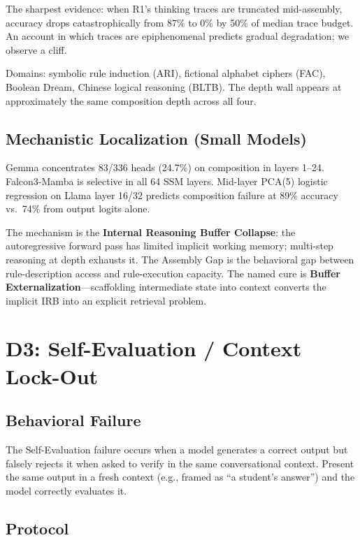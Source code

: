\documentclass[11pt]{article}
\newcommand{\irb}{Internal Reasoning Buffer}
\begin{document}
The sharpest evidence: when R1's thinking traces are truncated
mid-assembly, accuracy drops catastrophically from 87\% to 0\% by 50\%
of median trace budget. An account in which traces are epiphenomenal
predicts gradual degradation; we observe a cliff.

Domains: symbolic rule induction (ARI), fictional alphabet ciphers
(FAC), Boolean Dream, Chinese logical reasoning (BLTB). The depth wall
appears at approximately the same composition depth across all four.

\subsection{Mechanistic Localization (Small Models)}

Gemma concentrates 83/336 heads (24.7\%) on composition in layers 1--24.
Falcon3-Mamba is selective in all 64 SSM layers. Mid-layer PCA(5)
logistic regression on Llama layer 16/32 predicts composition failure at
89\% accuracy vs.\ 74\% from output logits alone.

The mechanism is the \textbf{\irb{} Collapse}: the autoregressive forward
pass has limited implicit working memory; multi-step reasoning at depth
exhausts it. The Assembly Gap is the behavioral gap between rule-description
access and rule-execution capacity. The named cure is \textbf{Buffer
Externalization}---scaffolding intermediate state into context converts
the implicit IRB into an explicit retrieval problem.

\section{D3: Self-Evaluation / Context Lock-Out}
\label{sec:d3}

\subsection{Behavioral Failure}

The Self-Evaluation failure occurs when a model generates a correct
output but falsely rejects it when asked to verify in the same
conversational context. Present the same output in a fresh context (e.g.,
framed as ``a student's answer'') and the model correctly evaluates it.

\subsection{Protocol}
\end{document}
